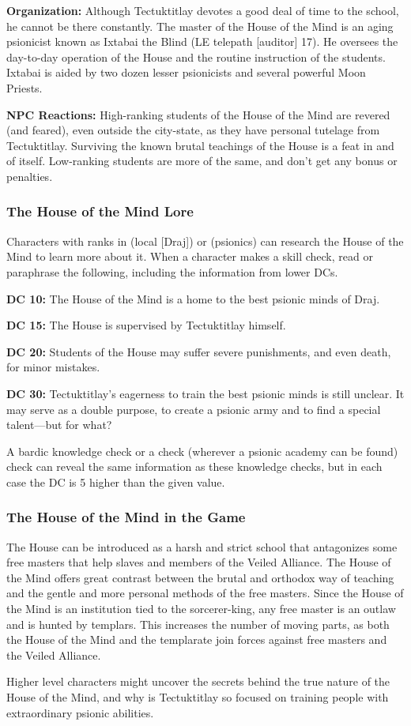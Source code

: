 \textbf{Organization:} Although Tectuktitlay devotes a good deal of time to the school, he cannot be there constantly. The master of the House of the Mind is an aging psionicist known as Ixtabai the Blind (LE telepath [auditor] 17). He oversees the day-to-day operation of the House and the routine instruction of the students. Ixtabai is aided by two dozen lesser psionicists and several powerful Moon Priests.

\textbf{NPC Reactions:} High-ranking students of the House of the Mind are revered (and feared), even outside the city-state, as they have personal tutelage from Tectuktitlay. Surviving the known brutal teachings of the House is a feat in and of itself. Low-ranking students are more of the same, and don't get any bonus or penalties.

\subsubsection{The House of the Mind Lore}
Characters with ranks in  (local [Draj]) or  (psionics) can research the House of the Mind to learn more about it. When a character makes a skill check, read or paraphrase the following, including the information from lower DCs.

\textbf{DC 10:} The House of the Mind is a home to the best psionic minds of Draj.

\textbf{DC 15:} The House is supervised by Tectuktitlay himself.

\textbf{DC 20:} Students of the House may suffer severe punishments, and even death, for minor mistakes.

\textbf{DC 30:} Tectuktitlay's eagerness to train the best psionic minds is still unclear. It may serve as a double purpose, to create a psionic army and to find a special talent---but for what?

A bardic knowledge check or a  check (wherever a psionic academy can be found) check can reveal the same information as these knowledge checks, but in each case the DC is 5 higher than the given value.

\subsubsection{The House of the Mind in the Game}
The House can be introduced as a harsh and strict school that antagonizes some free masters that help slaves and members of the Veiled Alliance. The House of the Mind offers great contrast between the brutal and orthodox way of teaching and the gentle and more personal methods of the free masters. Since the House of the Mind is an institution tied to the sorcerer-king, any free master is an outlaw and is hunted by templars. This increases the number of moving parts, as both the House of the Mind and the templarate join forces against free masters and the Veiled Alliance.

Higher level characters might uncover the secrets behind the true nature of the House of the Mind, and why is Tectuktitlay so focused on training people with extraordinary psionic abilities.